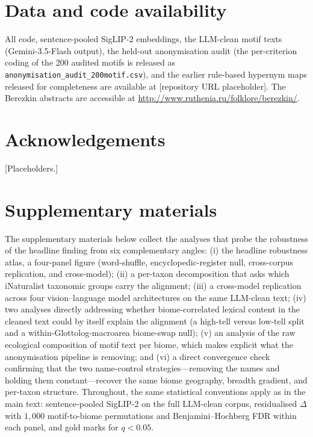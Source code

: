 \documentclass[11pt,a4paper]{article}
\begin{document}
\section*{Data and code availability}
All code, sentence-pooled SigLIP-2 embeddings, the LLM-clean motif
texts (Gemini-3.5-Flash output), the held-out anonymisation audit
(the per-criterion coding of the 200 audited motifs is released as
\texttt{anonymisation\_audit\_200motif.csv}), and the earlier
rule-based hypernym maps released for completeness are available at
[repository URL placeholder]. The Berezkin
abstracts are accessible at
\url{http://www.ruthenia.ru/folklore/berezkin/}.

\section*{Acknowledgements}
[Placeholders.]



\appendix
\section*{Supplementary materials}\label{app:supp}

The supplementary materials below collect the analyses that probe
the robustness of the headline finding from six complementary
angles: (i) the headline robustness atlas, a four-panel figure
(word-shuffle, encyclopedic-register null, cross-corpus replication,
and cross-model); (ii) a
per-taxon decomposition that asks which iNaturalist taxonomic
groups carry the alignment; (iii) a cross-model replication
across four vision--language model architectures on the same
LLM-clean text; (iv) two analyses directly addressing whether
biome-correlated lexical content in the cleaned text could by
itself explain the alignment (a high-tell versus low-tell split
and a within-Glottolog-macroarea biome-swap null); (v) an
analysis of the raw ecological composition of motif text per
biome, which makes explicit what the anonymisation pipeline is
removing; and (vi) a direct convergence check confirming that the
two name-control strategies---removing the names and holding them
constant---recover the same biome geography, breadth gradient, and
per-taxon structure. Throughout, the same statistical conventions apply as
in the main text: sentence-pooled SigLIP-2 on the full LLM-clean
corpus, residualised $\Delta$ with $1{,}000$ motif-to-biome
permutations and Benjamini--Hochberg FDR within each panel, and
gold marks for $q < 0.05$.
\end{document}
